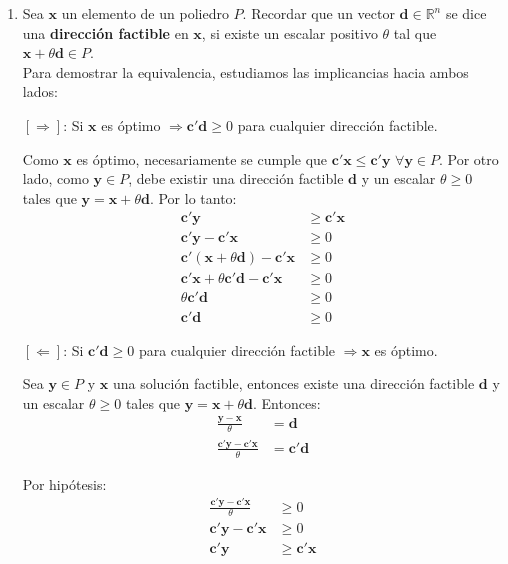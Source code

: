 \begin{enumerate}

\item[(a)]
Sea $\mathbf{x}$ un elemento de un poliedro $P$. Recordar que un vector $\mathbf{d} \in \mathbb{R}^n$ se dice una \textbf{dirección factible} en $\mathbf{x}$, si existe un escalar positivo $\theta$ tal que $\mathbf{x} + \theta \mathbf{d} \in P$.\\


Para demostrar la equivalencia, estudiamos las implicancias hacia ambos lados:

$\left[\Rightarrow\right]$: Si $\mathbf{x}$ es óptimo $\Rightarrow \mathbf{c}'\mathbf{d} \geq 0$ para cualquier dirección factible.

Como $\mathbf{x}$ es óptimo, necesariamente se cumple que $\mathbf{c}'\mathbf{x} \leq \mathbf{c}'\mathbf{y}$ $\forall \mathbf{y} \in P$. Por otro lado, como $\mathbf{y} \in P$, debe existir una dirección factible $\mathbf{d}$ y un escalar $\theta \geq 0$ tales que $\mathbf{y} = \mathbf{x} + \theta \mathbf{d}$. Por lo tanto:
\begin{align*}
        \mathbf{c}'\mathbf{y} &\geq \mathbf{c}'\mathbf{x} \\
        \mathbf{c}'\mathbf{y} - \mathbf{c}'\mathbf{x} &\geq 0 \\
        \mathbf{c}'(\mathbf{x} + \theta \mathbf{d}) - \mathbf{c}'\mathbf{x} &\geq 0 \\
        \mathbf{c}'\mathbf{x} + \theta \mathbf{c}'\mathbf{d} - \mathbf{c}'\mathbf{x} &\geq 0 \\
        \theta \mathbf{c}'\mathbf{d} &\geq 0 \\
        \mathbf{c}'\mathbf{d} &\geq 0
\end{align*}

$\left[\Leftarrow\right]$: Si $\mathbf{c}'\mathbf{d} \geq 0$ para cualquier dirección factible $\Rightarrow \mathbf{x}$ es óptimo.

Sea $\mathbf{y} \in P$ y $\mathbf{x}$ una solución factible, entonces existe una dirección factible $\mathbf{d}$ y un escalar $\theta \geq 0$ tales que $\mathbf{y} = \mathbf{x} + \theta \mathbf{d}$. Entonces:
\begin{align*}
\frac{\mathbf{y} - \mathbf{x}}{\theta} &= \mathbf{d} \\
\frac{\mathbf{c}'\mathbf{y} - \mathbf{c}'\mathbf{x}}{\theta} &= \mathbf{c}'\mathbf{d}
\end{align*}

Por hipótesis:
\begin{align*}
\frac{\mathbf{c}'\mathbf{y} - \mathbf{c}'\mathbf{x}}{\theta} &\geq 0 \\
\mathbf{c}'\mathbf{y} - \mathbf{c}'\mathbf{x} &\geq 0 \\
\mathbf{c}'\mathbf{y} &\geq \mathbf{c}'\mathbf{x}
\end{align*}


\end{enumerate}
